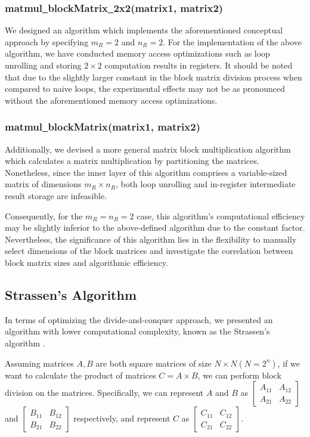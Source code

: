 \documentclass[conference]{IEEEtran}
\begin{document}
	\subsubsection{matmul\underline{\ }blockMatrix\underline{\ }2x2(matrix1, matrix2)}
	We designed an algorithm which implements the aforementioned conceptual approach by specifying $m_R = 2$ and $n_R = 2$. For the implementation of the above algorithm, we have conducted memory access optimizations such as loop unrolling and storing $2 \times 2$ computation results in registers. It should be noted that due to the slightly larger constant in the block matrix division process when compared to naive loops, the experimental effects may not be as pronounced without the aforementioned memory access optimizations. 
	\subsubsection{matmul\underline{\ }blockMatrix(matrix1, matrix2)}
	Additionally, we devised a more general matrix block multiplication algorithm which calculates a matrix multiplication by partitioning the matrices. Nonetheless, since the inner layer of this algorithm comprises a variable-sized matrix of dimensions $m_R \times n_R$, both loop unrolling and in-register intermediate result storage are infeasible.
	
	 Consequently, for the $m_R = n_R = 2$ case, this algorithm's computational efficiency may be slightly inferior to the above-defined algorithm due to the constant factor. Nevertheless, the significance of this algorithm lies in the flexibility to manually select dimensions of the block matrices and investigate the correlation between block matrix sizes and algorithmic efficiency.
	 
	 \subsection{Strassen's Algorithm}
	 In terms of optimizing the divide-and-conquer approach, we presented an algorithm with lower computational complexity, known as the Strassen's algorithm \cite{b5}.
	 
	 Assuming matrices $A, B$ are both square matrices of size $N \times N (N = 2 ^ n)$, if we want to calculate the product of matrices $C = A \times B$, we can perform block division on the matrices. Specifically, we can represent $A$ and $B$ as $\begin{bmatrix}
	 	A_{11} & A_{12}\\
	 	A_{21} & A_{22}
	 \end{bmatrix}$ and $\begin{bmatrix}
	 	B_{11} & B_{12}\\
	 	B_{21} & B_{22}
	 \end{bmatrix}$ respectively, and represent $C$ as $\begin{bmatrix}
	 	C_{11} & C_{12}\\
	 	C_{21} & C_{22}
	 \end{bmatrix}$.
 
\end{document}
